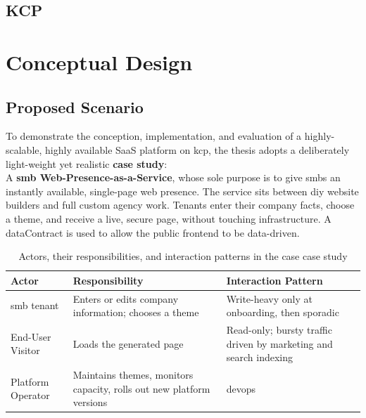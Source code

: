 \documentclass[11pt, a4paper, oneside, listof=totoc]{scrartcl}
\begin{document}
        \subsection{KCP}\label{subsec:relatedKCP}

    \section{Conceptual Design}\label{sec:concept}

        \subsection{Proposed Scenario}\label{subsec:scenario}
            To demonstrate the conception, implementation, and evaluation of a highly-scalable, 
            highly available SaaS platform on \gls{kcp}, the thesis adopts a deliberately
            light-weight yet realistic \textbf{case study}:
            \\
            A \textbf{\gls{smb} Web-Presence-as-a-Service}, whose sole purpose is to give
            \glspl{smb} an instantly available, single-page web presence.
            The service sits between \gls{diy} website builders and full custom agency work.
            Tenants enter their company facts, choose a theme, and receive a live, secure page,
            without touching infrastructure.
            A \gls{dataContract} is used to allow the public frontend to be data-driven.
            
            \begin{table}[H]
                \centering
                \renewcommand{\arraystretch}{1.5}
                \begin{tabular}{lP{4cm}P{8cm}}
                    \toprule
                    Actor & Responsibility & Interaction Pattern \\
                    \midrule
                    \gls{smb} tenant & Enters or edits company information; chooses a theme & Write-heavy only at onboarding, then sporadic \\
                    End-User Visitor & Loads the generated page & Read-only; bursty traffic driven by marketing and search indexing \\
                    Platform Operator & Maintains themes, monitors capacity, rolls out new platform versions & \Gls{devops} \\
                    \bottomrule
                \end{tabular}
                \caption{Actors, their responsibilities, and interaction patterns in the case case study}\label{tab:scenario}
            \end{table}
            
\end{document}
